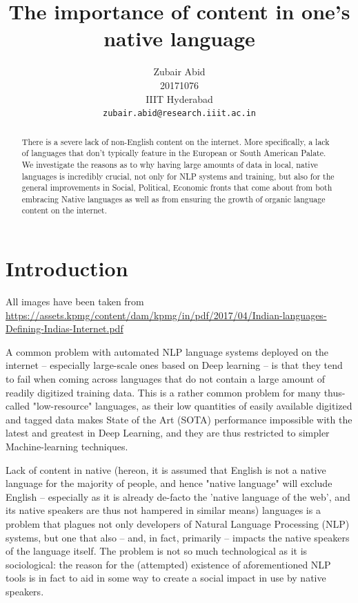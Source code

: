 \documentclass[11pt]{article}
\title{The importance of content in one's native language}
\author{Zubair Abid \\
  20171076\\
  IIIT Hyderabad\\
  {\tt zubair.abid@research.iiit.ac.in} }%
\date{}
\begin{document}
\maketitle
\begin{abstract}
    There is a severe lack of non-English content on the internet. More
    specifically, a lack of languages that don't typically feature in the
    European or South American Palate. We investigate the reasons as to why
    having large amounts of data in local, native languages is incredibly
    crucial, not only for NLP systems and training, but also for the general
    improvements in Social, Political, Economic fronts that come about from
    both embracing Native languages as well as from ensuring the growth of
    organic language content on the internet.
\end{abstract}

\section{Introduction}
\label{intro}

All images have been taken from
\url{https://assets.kpmg/content/dam/kpmg/in/pdf/2017/04/Indian-languages-Defining-Indias-Internet.pdf}

A common problem with automated NLP language systems deployed on the internet --
especially large-scale ones based on Deep learning --  is that they tend to fail
when coming across languages that do not contain a large amount of readily
digitized training data. This is a rather common problem for many thus-called
"low-resource" languages, as their low quantities of easily available digitized
and tagged data makes State of the Art (SOTA) performance impossible with the
latest and greatest in Deep Learning, and they are thus restricted to simpler
Machine-learning techniques.

Lack of content in native (hereon, it is assumed that English is not a native
language for the majority of people, and hence "native language" will exclude
English -- especially as it is already de-facto the 'native language of the
web', and its native speakers are thus not hampered in similar means) languages
is a problem that plagues not only developers of Natural Language Processing
(NLP) systems, but one that also -- and, in fact, primarily -- impacts the
native speakers of the language itself. The problem is not so much technological
as it is sociological: the reason for the (attempted) existence of
aforementioned NLP tools is in fact to aid in some way to create a social impact
in use by native speakers. 
\end{document}
